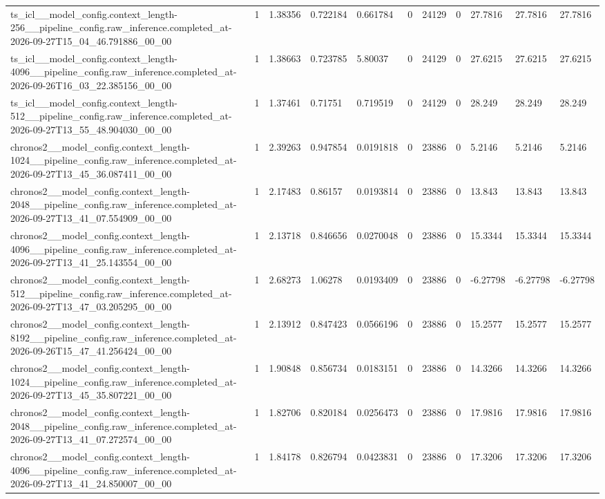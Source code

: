 \begin{tabular}{lllllllllll}
ts\_icl\_\_model\_config.context\_length-256\_\_pipeline\_config.raw\_inference.completed\_at-2026-09-27T15\_04\_46.791886\_00\_00 & 1 & 1.38356 & 0.722184 & 0.661784 & 0 & 24129 & 0 & 27.7816 & 27.7816 & 27.7816 \\
ts\_icl\_\_model\_config.context\_length-4096\_\_pipeline\_config.raw\_inference.completed\_at-2026-09-26T16\_03\_22.385156\_00\_00 & 1 & 1.38663 & 0.723785 & 5.80037 & 0 & 24129 & 0 & 27.6215 & 27.6215 & 27.6215 \\
ts\_icl\_\_model\_config.context\_length-512\_\_pipeline\_config.raw\_inference.completed\_at-2026-09-27T13\_55\_48.904030\_00\_00 & 1 & 1.37461 & 0.71751 & 0.719519 & 0 & 24129 & 0 & 28.249 & 28.249 & 28.249 \\
chronos2\_\_model\_config.context\_length-1024\_\_pipeline\_config.raw\_inference.completed\_at-2026-09-27T13\_45\_36.087411\_00\_00 & 1 & 2.39263 & 0.947854 & 0.0191818 & 0 & 23886 & 0 & 5.2146 & 5.2146 & 5.2146 \\
chronos2\_\_model\_config.context\_length-2048\_\_pipeline\_config.raw\_inference.completed\_at-2026-09-27T13\_41\_07.554909\_00\_00 & 1 & 2.17483 & 0.86157 & 0.0193814 & 0 & 23886 & 0 & 13.843 & 13.843 & 13.843 \\
chronos2\_\_model\_config.context\_length-4096\_\_pipeline\_config.raw\_inference.completed\_at-2026-09-27T13\_41\_25.143554\_00\_00 & 1 & 2.13718 & 0.846656 & 0.0270048 & 0 & 23886 & 0 & 15.3344 & 15.3344 & 15.3344 \\
chronos2\_\_model\_config.context\_length-512\_\_pipeline\_config.raw\_inference.completed\_at-2026-09-27T13\_47\_03.205295\_00\_00 & 1 & 2.68273 & 1.06278 & 0.0193409 & 0 & 23886 & 0 & -6.27798 & -6.27798 & -6.27798 \\
chronos2\_\_model\_config.context\_length-8192\_\_pipeline\_config.raw\_inference.completed\_at-2026-09-26T15\_47\_41.256424\_00\_00 & 1 & 2.13912 & 0.847423 & 0.0566196 & 0 & 23886 & 0 & 15.2577 & 15.2577 & 15.2577 \\
chronos2\_\_model\_config.context\_length-1024\_\_pipeline\_config.raw\_inference.completed\_at-2026-09-27T13\_45\_35.807221\_00\_00 & 1 & 1.90848 & 0.856734 & 0.0183151 & 0 & 23886 & 0 & 14.3266 & 14.3266 & 14.3266 \\
chronos2\_\_model\_config.context\_length-2048\_\_pipeline\_config.raw\_inference.completed\_at-2026-09-27T13\_41\_07.272574\_00\_00 & 1 & 1.82706 & 0.820184 & 0.0256473 & 0 & 23886 & 0 & 17.9816 & 17.9816 & 17.9816 \\
chronos2\_\_model\_config.context\_length-4096\_\_pipeline\_config.raw\_inference.completed\_at-2026-09-27T13\_41\_24.850007\_00\_00 & 1 & 1.84178 & 0.826794 & 0.0423831 & 0 & 23886 & 0 & 17.3206 & 17.3206 & 17.3206 \\

\end{tabular}
